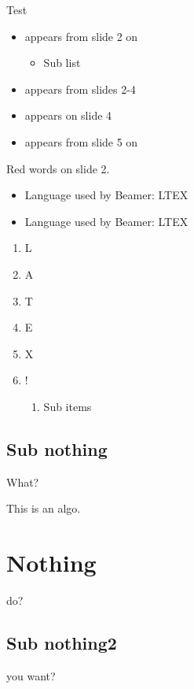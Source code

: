 \documentclass{beamer}
\begin{document}
\begin{frame}{Test}
    \begin{itemize}
        \item<2-> appears from slide 2 on
        \begin{itemize}
            \item Sub list
        \end{itemize}
        \item<2-4> appears from slides 2-4
        \item<4> appears on slide 4
        \item<5-> appears from slide 5 on
    \end{itemize}


     
    \alert<2>{Red words on slide 2.}  %


    \begin{itemize}
        \item Language used by Beamer: LTEX
        \item Language used by Beamer: LTEX
    \end{itemize}

    \begin{enumerate}[<+-| alert@+>]
        \item L
        \item A
        \item T
        \item E
        \item X
        \item !
        \begin{enumerate}
            \item Sub items
        \end{enumerate}
    \end{enumerate}
\end{frame}

\subsection{Sub nothing}
\begin{frame}{What?}
    \begin{algo}
        This is an algo.
    \end{algo}
\end{frame}

\section{Nothing}
\begin{frame}{do?}
\end{frame}

\subsection{Sub nothing2}
\begin{frame}{you want?}
\end{frame}


\end{document}
